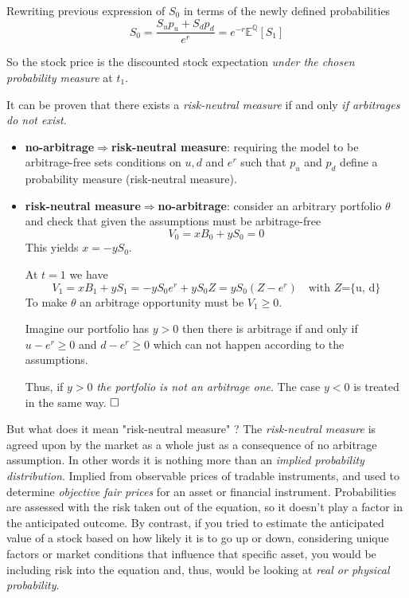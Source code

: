 \documentclass[12pt,a4paper]{book}
\newcommand{\myendproof}{\ensuremath{\hfill\square}}
\begin{document}
Rewriting previous expression of $S_0$ in terms of the newly defined probabilities
\begin{equation}
S_0 = \frac{S_up_u + S_dp_d}{e^r} = e^{-r}\mathbb{E}^\mathbb{Q}[S_1]
\label{eq:risk_neutral_price}
\end{equation}
		
So the stock price is the discounted stock expectation \emph{under the chosen probability measure} at $t_1$.
	
It can be proven that there exists a \emph{risk-neutral measure} if and only \emph{if arbitrages do not exist}. 
\begin{itemize}
\item \textbf{no-arbitrage$\Rightarrow$risk-neutral measure}: requiring the model to be arbitrage-free sets conditions on $u, d$ and $e^r$ such that $p_u$ and $p_d$ define a probability measure (risk-neutral measure).
\item \textbf{risk-neutral measure$\Rightarrow$no-arbitrage}: consider an arbitrary portfolio $\theta$ and check that given the assumptions must be arbitrage-free
\begin{equation*}
V_0 = xB_0 + yS_0 = 0
\end{equation*}
This yields $x = -yS_0$.

At $t=1$ we have 
\begin{equation*}
V_1 = xB_1 + yS_1 = -yS_0e^r + yS_0Z = yS_0(Z - e^r)\quad\text{with $Z$=\{u, d\}}
\end{equation*}
To make $\theta$ an arbitrage opportunity must be $V_1\geq 0$.
			
Imagine our portfolio has $y > 0$ then there is arbitrage if and only if $u - e^r \geq 0$ and $d - e^r \geq 0$
which can not happen according to the assumptions. 
			
Thus, if $y > 0$ \emph{the portfolio is not an arbitrage one}. The case $y < 0$ is treated in the same way.
\myendproof
\end{itemize}

But what does it mean "risk-neutral measure" ?
The \emph{risk-neutral measure} is agreed upon by the market as a whole just as a consequence of no arbitrage assumption.
In other words it is nothing more than an \emph{implied probability distribution}.
Implied from observable prices of tradable instruments, and used to determine \emph{objective fair prices} for an asset or financial instrument. Probabilities are assessed with the risk taken out of the equation, so it doesn’t play a factor in the anticipated outcome.
By contrast, if you tried to estimate the anticipated value of a stock based on how likely it is to go up or down, considering unique factors or market conditions that influence that specific asset, you would be including risk into the equation and, thus, would be looking at \emph{real or physical probability}.
\end{document}
